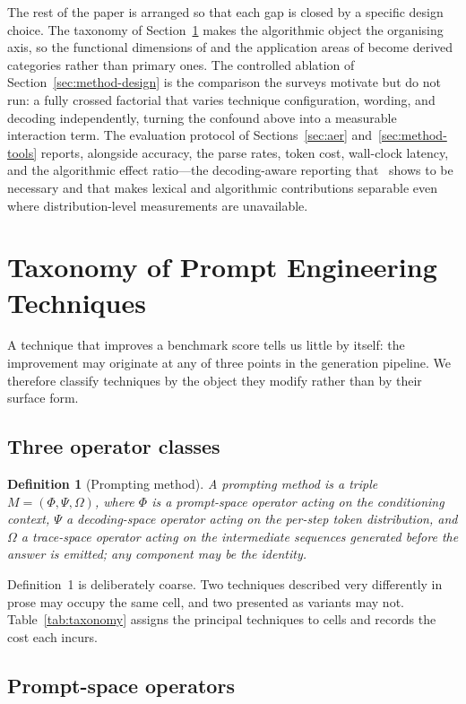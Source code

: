 \documentclass[conference]{IEEEtran}
\begin{document}
The rest of the paper is arranged so that each gap is closed by a
specific design choice.  The taxonomy of Section~\ref{sec:taxonomy}
makes the algorithmic object the organising axis, so the functional
dimensions of \cite{b24} and the application areas of \cite{b23}
become derived categories rather than primary ones.  The controlled
ablation of Section~\ref{sec:method-design} is the comparison the
surveys motivate but do not run: a fully crossed factorial that varies
technique configuration, wording, and decoding independently, turning
the confound above into a measurable interaction term.  The
evaluation protocol of Sections~\ref{sec:aer} and~\ref{sec:method-tools}
reports, alongside accuracy, the parse rates, token cost, wall-clock
latency, and the algorithmic effect ratio---the decoding-aware
reporting that~\cite{b26} shows to be necessary and that makes
lexical and algorithmic contributions separable even where
distribution-level measurements are unavailable.

\section{Taxonomy of Prompt Engineering Techniques}
\label{sec:taxonomy}

A technique that improves a benchmark score tells us little by itself:
the improvement may originate at any of three points in the generation
pipeline.  We therefore classify techniques by the object they modify
rather than by their surface form.

\subsection{Three operator classes}

\textbf{Definition 1} (Prompting method). \textit{A prompting method is a triple $M = (\Phi, \Psi, \Omega)$, where $\Phi$ is a prompt-space operator acting on the conditioning context, $\Psi$ a decoding-space operator acting on the per-step token distribution, and $\Omega$ a trace-space operator acting on the intermediate sequences generated before the answer is emitted; any component may be the identity.}

Definition~1 is deliberately coarse.  Two techniques described very
differently in prose may occupy the same cell, and two presented as
variants may not.  Table~\ref{tab:taxonomy} assigns the principal
techniques to cells and records the cost each incurs.

\subsection{Prompt-space operators}
\end{document}
